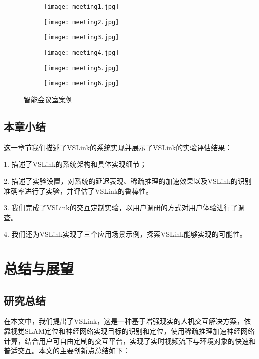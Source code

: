 \begin{figure}[htb]
	\centering
	\begin{subfigure}{.48\linewidth}
		\texttt{[image: meeting1.jpg]}
		\caption{}
	\end{subfigure}
	\quad
	\begin{subfigure}{.48\linewidth}
		\texttt{[image: meeting2.jpg]}
		\caption{}
	\end{subfigure}
	\quad
	\begin{subfigure}{.48\linewidth}
		\texttt{[image: meeting3.jpg]}
		\caption{}
	\end{subfigure}
	\quad
	\begin{subfigure}{.48\linewidth}
		\texttt{[image: meeting4.jpg]}
		\caption{}
	\end{subfigure}
	\quad
	\begin{subfigure}{.48\linewidth}
		\texttt{[image: meeting5.jpg]}
		\caption{}
	\end{subfigure}
	\quad
	\begin{subfigure}{.48\linewidth}
		\texttt{[image: meeting6.jpg]}
		\caption{}
	\end{subfigure}
	\caption{智能会议室案例}\label{fig:meeting}
\end{figure}

\section{本章小结}
这一章节我们描述了VSLink的系统实现并展示了VSLink的实验评估结果：

1. 描述了VSLink的系统架构和具体实现细节；

2. 描述了实验设置，对系统的延迟表现、稀疏推理的加速效果以及VSLink的识别准确率进行了实验，并评估了VSLink的鲁棒性。

3. 我们完成了VSLink的交互定制实验，以用户调研的方式对用户体验进行了调查。

4. 我们还为VSLink实现了三个应用场景示例，探索VSLink能够实现的可能性。

\chapter{总结与展望}
\label{chap:sum}
\section{研究总结}
在本文中，我们提出了VSLink，这是一种基于增强现实的人机交互解决方案，依靠视觉SLAM定位和神经网络实现目标的识别和定位，使用稀疏推理加速神经网络计算，结合用户可自由定制的交互平台，实现了实时视频流下与环境对象的快速和普适交互。本文的主要创新点总结如下：


